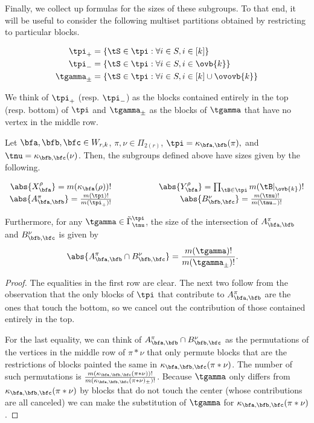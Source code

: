 Finally, we collect up formulas for the sizes of these subgroups. To that end, it will be useful to consider the following multiset partitions obtained by restricting to particular blocks.

\begin{align*}
    \tpi_+&=\{\tS\in\tpi:\forall i\in S,i\in[k]\}\\
    \tpi_-&=\{\tS\in\tpi:\forall i\in S,i\in\ovb{k}\}\\
    \tgamma_\pm&=\{\tS\in\tpi:\forall i\in S,i\in[k]\cup\ovovb{k}\}
\end{align*}

We think of $\tpi_+$ (resp. $\tpi_-$) as the blocks contained entirely in the top (resp. bottom) of $\tpi$ and $\tgamma_\pm$ as the blocks of $\tgamma$ that have no vertex in the middle row.

\begin{lemma}\label{lem:subgroup_sizes}
    Let $\bfa,\bfb,\bfc\in W_{r,k}$, $\pi,\nu\in\Pi_{2(r)}$, $\tpi=\kappa_{\bfa,\bfb}(\pi),$ and $\tnu=\kappa_{\bfb,\bfc}(\nu)$. Then, the subgroups defined above have sizes given by the following.

    \begin{align*}
        \begin{array}{ccc}
            \abs{X^\rho_\bfa}=m(\kappa_\bfa(\rho))! & \hspace{.5in} & \abs{Y^\rho_\bfa}=\prod_{\tB\in\tpi}m(\tB|_{\ovb{k}})! \\
            \abs{A^\pi_{\bfa,\bfb}}=\frac{m(\tpi)!}{m(\tpi_+)!} & & \abs{B^\nu_{\bfb,\bfc}}=\frac{m(\tnu)!}{m(\tnu_-)!}
        \end{array}
    \end{align*}

    Furthermore, for any $\tgamma\in\tilde\Gamma^\tpi_\tnu$, the size of the intersection of $A^\pi_{\bfa,\bfb}$ and $B^\nu_{\bfb,\bfc}$ is given by \begin{align*}
        \abs{A^\pi_{\bfa,\bfb}\cap B^\nu_{\bfb,\bfc}}&=\frac{m(\tgamma)!}{m(\tgamma_\pm)!}.
    \end{align*}
\end{lemma}

\begin{proof}
    The equalities in the first row are clear. The next two follow from the observation that the only blocks of $\tpi$ that contribute to $A_{\bfa,\bfb}^\pi$ are the ones that touch the bottom, so we cancel out the contribution of those contained entirely in the top.

    For the last equality, we can think of $A_{\bfa,\bfb}^\pi\cap B^\nu_{\bfb,\bfc}$ as the permutations of the vertices in the middle row of $\pi\ast\nu$ that only permute blocks that are the restrictions of blocks painted the same in $\kappa_{\bfa,\bfb,\bfc}(\pi\ast\nu)$. The number of such permutations is $\frac{m(\kappa_{\bfa,\bfb,\bfc}(\pi\ast\nu))!}{m(\kappa_{\bfa,\bfb,\bfc}(\pi\ast\nu)_\pm)!}$. Because $\tgamma$ only differs from $\kappa_{\bfa,\bfb,\bfc}(\pi\ast\nu)$ by blocks that do not touch the center (whose contributions are all canceled) we can make the substitution of $\tgamma$ for $\kappa_{\bfa,\bfb,\bfc}(\pi\ast\nu)$.
\end{proof}



